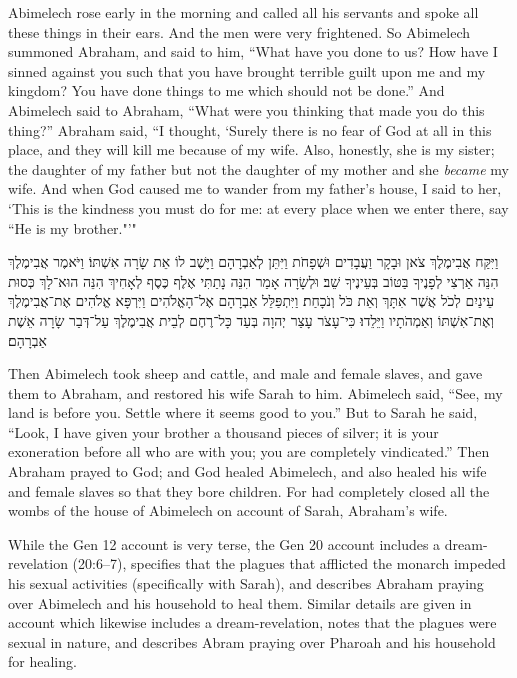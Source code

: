 \begin{translation}
    Abimelech rose early in the morning and called all his servants and spoke all these things in their ears. And the men were very frightened. 
    So Abimelech summoned Abraham, and said to him, ``What have you done to us? How have I sinned against you such that you have brought terrible guilt upon me and my kingdom? You have done things to me which should not be done.''
    And Abimelech said to Abraham, “What were you thinking that made you do this thing?” 
    Abraham said, ``I thought, `Surely there is no fear of God at all in this place, and they will kill me because of my wife. 
    Also, honestly, she is my sister; the daughter of my father but not the daughter of my mother and she \emph{became} my wife.
    And when God caused me to wander from my father's house, I said to her, `This is the kindness you must do for me: at every place when we enter there, say  ``He is my brother."'"
\end{translation}

\begin{hebrewtext}
    וַיִּקַּח אֲבִימֶלֶךְ צֹאן וּבָקָר וַעֲבָדִים וּשְׁפָחֹת וַיִּתֵּן לְאַבְרָהָם וַיָּשֶׁב לוֹ אֵת שָׂרָה אִשְׁתּוֹ׃
    וַיֹּאמֶר אֲבִימֶלֶךְ הִנֵּה אַרְצִי לְפָנֶיךָ בַּטּוֹב בְּעֵינֶיךָ שֵׁב׃
    וּלְשָׂרָה אָמַר הִנֵּה נָתַתִּי אֶלֶף כֶּסֶף לְאָחִיךְ הִנֵּה הוּא־לָךְ כְּסוּת עֵינַיִם לְכֹל אֲשֶׁר אִתָּךְ וְאֵת כֹּל וְנֹכָחַת׃
    וַיִּתְפַּלֵּל אַבְרָהָם אֶל־הָאֱלֹהִים וַיִּרְפָּא אֱלֹהִים אֶת־אֲבִימֶלֶךְ וְאֶת־אִשְׁתּוֹ וְאַמְהֹתָיו וַיֵּלֵדוּ׃
    כִּי־עָצֹר עָצַר יְהוָה בְּעַד כָּל־רֶחֶם לְבֵית אֲבִימֶלֶךְ עַל־דְּבַר שָׂרָה אֵשֶׁת אַבְרָהָם׃  
\end{hebrewtext}

\begin{translation}
    Then Abimelech took sheep and cattle, and male and female slaves, and gave them to Abraham, and restored his wife Sarah to him.
    Abimelech said, ``See, my land is before you. Settle where it seems good to you.'' 
    But to Sarah he said, ``Look, I have given your brother a thousand pieces of silver; it is your exoneration before all who are with you; you are completely vindicated.'' 
    Then Abraham prayed to God; and God healed Abimelech, and also healed his wife and female slaves so that they bore children. 
    For \yahweh had completely closed all the wombs of the house of Abimelech on account of Sarah, Abraham's wife.
\end{translation}
\noindent
While the Gen 12 account is very terse, the Gen 20 account includes a dream-revelation (20:6--7), specifies that the plagues that afflicted the monarch impeded his sexual activities (specifically with Sarah), and describes Abraham praying over Abimelech and his household to heal them. Similar details are given in \ga account which likewise includes a dream-revelation, notes that the plagues were sexual in nature, and describes Abram praying over Pharoah and his household for healing. 

